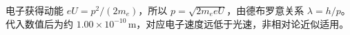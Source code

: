 电子获得动能 $eU=p^2/(2m_e)$，所以 $p=\sqrt{2m_eeU}$，由德布罗意关系 $\lambda=h/p$。代入数值后为约 $1.00\times10^{-10}\,\mathrm m$，对应电子速度远低于光速，非相对论近似适用。
